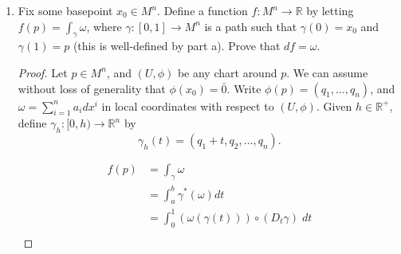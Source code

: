 \documentclass{article}
\begin{document}
\begin{enumerate}[label={\bf Q\arabic*:}]
\begin{enumerate}
\begin{proof}
          Then $\gamma$ is a smooth path, even at $t=1$, because
          $h\restriction[0,t_0]=0$ and $h\restriction[t_1,1]=1$,
          there will be an open interval containing
          $t=1$ where $\gamma$ is constant. Furthermore, $\gamma$ is a
          closed path, so from assumption $\int_\gamma\omega=0$. Now
          \begin{align*}
            0 &=\int_\gamma\omega \\
              &=\int_{\gamma_1\circ h}\omega - \int_{\gamma_2\circ h}\omega
                \\
              &=\int_{\gamma_1}\omega - \int_{\gamma_2}\omega &(\text{from
                Question 1}), \\
          \end{align*}
          and so $\int_{\gamma_1}\omega=\int_{\gamma_2}\omega$ as required.
        \end{proof}

      \item Fix some basepoint $x_0\in M^n$. Define a function
        $f:M^n\rightarrow\mathbb{R}$ by letting $f(p)=\int_\gamma\omega$,
        where $\gamma:[0,1]\rightarrow M^n$ is a path such that
        $\gamma(0)=x_0$ and $\gamma(1)=p$ (this is well-defined by part a).
        Prove that $df=\omega$.

        \begin{proof}
          Let $p\in M^n$, and $(U,\phi)$ be any chart around $p$. We can
          assume without loss of generality that $\phi(x_0)=\bar{0}$. Write
          $\phi(p)=(q_1,\ldots,q_n)$, and $\omega =\sum_{i=1}^n a_idx^i$ in
          local coordinates with respect to $(U,\phi)$. Given
          $h\in\mathbb{R}^+$, define
          $\gamma_h:[0,h)\rightarrow\mathbb{R}^n$ by \[\gamma_h(t)
          =(q_1+t,q_2,\ldots,q_n).\]
          
          \begin{align*}
            f(p) &= \int_\gamma\omega \\
              &=\int_a^b\gamma^*(\omega)dt \\
              &=\int_0^1(\omega(\gamma(t))) \circ(D_t\gamma)\; dt \\
          \end{align*}
        \end{proof}
    \end{enumerate}
\end{enumerate}
\end{document}
